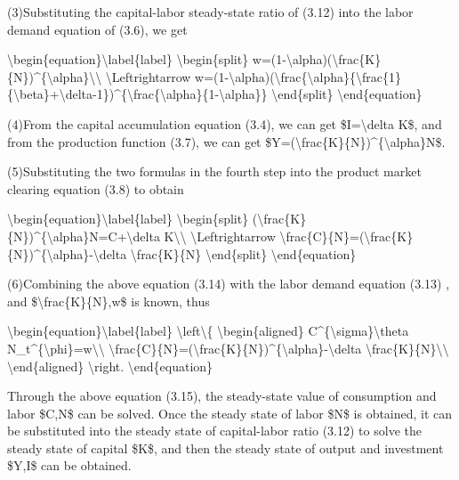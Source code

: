 \documentclass[10pt,math=newtx,citestyle=gb7714-2015,bibstyle=gb7714-2015]{elegantbook}
\begin{document}
	(3)Substituting the capital-labor steady-state ratio of (3.12) into the labor demand equation of (3.6), we get
	
	\textbackslash{}begin\{equation\}\textbackslash{}label\{label\}
	\textbackslash{}begin\{split\}
	w=(1-\textbackslash{}alpha)(\textbackslash{}frac\{K\}\{N\})\^{}\{\textbackslash{}alpha\}\textbackslash{}\textbackslash{}
	\textbackslash{}Leftrightarrow w=(1-\textbackslash{}alpha)(\textbackslash{}frac\{\textbackslash{}alpha\}\{\textbackslash{}frac\{1\}\{\textbackslash{}beta\}+\textbackslash{}delta-1\})\^{}\{\textbackslash{}frac\{\textbackslash{}alpha\}\{1-\textbackslash{}alpha\}\}
	\textbackslash{}end\{split\}
	\textbackslash{}end\{equation\}
	
	(4)From the capital accumulation equation (3.4), we can get \$I=\textbackslash{}delta K\$, and from the production function (3.7), we can get \$Y=(\textbackslash{}frac\{K\}\{N\})\^{}\{\textbackslash{}alpha\}N\$.
	
	(5)Substituting the two formulas in the fourth step into the product market clearing equation (3.8) to obtain
	
	\textbackslash{}begin\{equation\}\textbackslash{}label\{label\}
	\textbackslash{}begin\{split\}
	(\textbackslash{}frac\{K\}\{N\})\^{}\{\textbackslash{}alpha\}N=C+\textbackslash{}delta K\textbackslash{}\textbackslash{}
	\textbackslash{}Leftrightarrow \textbackslash{}frac\{C\}\{N\}=(\textbackslash{}frac\{K\}\{N\})\^{}\{\textbackslash{}alpha\}-\textbackslash{}delta \textbackslash{}frac\{K\}\{N\}
	\textbackslash{}end\{split\}
	\textbackslash{}end\{equation\}
	
	(6)Combining the above equation (3.14) with the labor demand equation (3.13) , and \$\textbackslash{}frac\{K\}\{N\},w\$ is known, thus
	
	\textbackslash{}begin\{equation\}\textbackslash{}label\{label\}
	\textbackslash{}left\textbackslash{}\{
	\textbackslash{}begin\{aligned\}
	C\^{}\{\textbackslash{}sigma\}\textbackslash{}theta N\_t\^{}\{\textbackslash{}phi\}=w\textbackslash{}\textbackslash{}
	\textbackslash{}frac\{C\}\{N\}=(\textbackslash{}frac\{K\}\{N\})\^{}\{\textbackslash{}alpha\}-\textbackslash{}delta \textbackslash{}frac\{K\}\{N\}\textbackslash{}\textbackslash{}
	\textbackslash{}end\{aligned\}
	\textbackslash{}right.
	\textbackslash{}end\{equation\}
	
	Through the above equation (3.15), the steady-state value of consumption and labor \$C,N\$ can be solved. Once the steady state of labor \$N\$ is obtained, it can be substituted into the steady state of capital-labor ratio (3.12) to solve the steady state of capital \$K\$, and then the steady state of output and investment \$Y,I\$ can be obtained.
	
\end{document}
